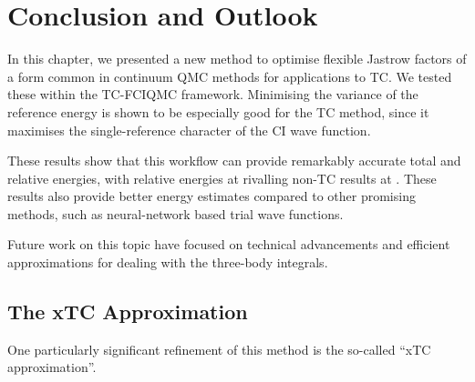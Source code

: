 \section{Conclusion and Outlook}

In this chapter, we presented a new method to optimise flexible Jastrow factors of a form common in continuum QMC methods for applications to TC. We tested these within the TC-FCIQMC framework. Minimising the variance of the reference energy is shown to be especially good for the TC method, since it maximises the single-reference character of the CI wave function.

These results show that this workflow can provide remarkably accurate total and relative energies, with relative energies at \vtz rivalling non-TC results at . These results also provide better energy estimates compared to other promising methods, such as neural-network based trial wave functions.

Future work on this topic have focused on technical advancements and efficient approximations for dealing with the three-body integrals.

\subsection{The xTC Approximation}

One particularly significant refinement of this method is the so-called ``xTC approximation''.\cite{christlmaierXTC2023}


\label{sec:xtc}
